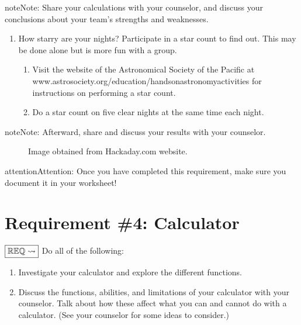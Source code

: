 \documentclass[letterpaper,10pt,english,openany,oneside]{sphinxmanual}
\let\sphinxpxdimen\pdfpxdimen\else\newdimen\sphinxpxdimen
\begin{document}
\begin{sphinxadmonition}{note}{Note:}
Share your calculations with your counselor, and discuss your conclusions about your team’s strengths and weaknesses.
\end{sphinxadmonition}
\begin{enumerate}
%
\setcounter{enumi}{4}
\item {} 
How starry are your nights? Participate in a star count to find out. This may be done alone but is more fun with a group.
\begin{enumerate}
%
\item {} 
Visit the website of the Astronomical Society of the Pacific at www.astrosociety.org/education/hands\sphinxhyphen{}on\sphinxhyphen{}astronomy\sphinxhyphen{}activities for instructions on performing a star count.

\item {} 
Do a star count on five clear nights at the same time each night.

\end{enumerate}

\end{enumerate}

\begin{sphinxadmonition}{note}{Note:}
Afterward, share and discuss your results with your counselor.
\end{sphinxadmonition}

\begin{figure}[htbp]
\centering
\capstart

\noindent\sphinxincludegraphics[width=600\sphinxpxdimen]{{turing}.png}
\caption{Image obtained from Hackaday.com website.}\label{\detokenize{requirement3:id1}}\end{figure}

\begin{sphinxadmonition}{attention}{Attention:}
Once you have completed this requirement, make sure you document it in your worksheet!
\end{sphinxadmonition}


\chapter{Requirement \#4: Calculator}
\label{\detokenize{requirement4:requirement-4-calculator}}\label{\detokenize{requirement4::doc}}
\(\boxed{\mathbb{REQ}\Large \rightsquigarrow}\) Do all of the following:
\begin{enumerate}
%
\item {} 
Investigate your calculator and explore the different functions.

\item {} 
Discuss the functions, abilities, and limitations of your calculator with your counselor. Talk about how these affect what you can and cannot do with a calculator. (See your counselor for some ideas to consider.)

\end{enumerate}
\end{document}
